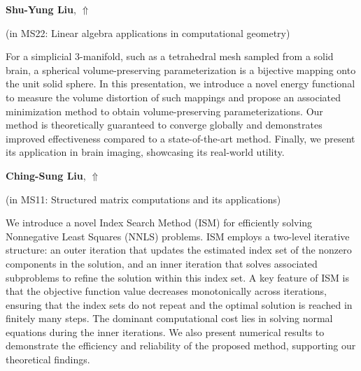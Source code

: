 \documentclass[ILAS2025-program.tex]{subfiles}
\begin{document}
\hypertarget{down0067}{}\begin{ilasabstract}
    
\textbf{Shu-Yung Liu},  \hfill \hyperlink{up0067}{$\Uparrow$}
    
    
(in {\color{mstitle}MS22: Linear algebra applications in computational geometry})
        
\mtskip
    For a simplicial $3$-manifold, such as a tetrahedral mesh sampled from a solid brain, a spherical volume-preserving parameterization is a bijective mapping onto the unit solid sphere. In this presentation, we introduce a novel energy functional to measure the volume distortion of such mappings and propose an associated minimization method to obtain volume-preserving parameterizations. Our method is theoretically guaranteed to converge globally and demonstrates improved effectiveness compared to a state-of-the-art method. Finally, we present its application in brain imaging, showcasing its real-world utility.
\end{ilasabstract}
    

\hypertarget{down0234}{}\begin{ilasabstract}
    
\textbf{Ching-Sung Liu},  \hfill \hyperlink{up0234}{$\Uparrow$}
    
    
(in {\color{mstitle}MS11: Structured matrix computations and its applications})
        
\mtskip
    We introduce a novel Index Search Method (ISM) for efficiently solving Nonnegative Least Squares (NNLS) problems. ISM employs a two-level iterative structure: an outer iteration that updates the estimated index set of the nonzero components in the solution, and an inner iteration that solves associated subproblems to refine the solution within this index set. A key feature of ISM is that the objective function value decreases monotonically across iterations, ensuring that the index sets do not repeat and the optimal solution is reached in finitely many steps. The dominant computational cost lies in solving normal equations during the inner iterations. We also present numerical results to demonstrate the efficiency and reliability of the proposed method, supporting our theoretical findings.


\end{ilasabstract}
    
\end{document}
